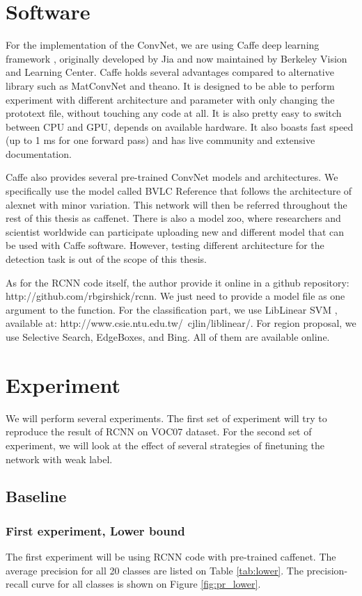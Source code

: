 \documentclass[a4paper,11pt]{kth-mag}
\begin{document}
\section{Software}
For the implementation of the ConvNet, we are using Caffe deep learning framework \cite{caffe}, originally developed by Jia and now maintained by Berkeley Vision and Learning Center. Caffe holds several advantages compared to alternative library such as MatConvNet and theano. It is designed to be able to perform experiment with different architecture and parameter with only changing the prototext file, without touching any code at all. It is also pretty easy to switch between CPU and GPU, depends on available hardware. It also boasts fast speed (up to 1 ms for one forward pass) and has live community and extensive documentation.

Caffe also provides several pre-trained ConvNet models and architectures. We specifically use the model called BVLC Reference that follows the architecture of alexnet with minor variation. This network will then be referred throughout the rest of this thesis as caffenet. There is also a model zoo, where researchers and scientist worldwide can participate uploading new and different model that can be used with Caffe software. However, testing different architecture for the detection task is out of the scope of this thesis.

As for the RCNN code itself, the author provide it online in a github repository: http://github.com/rbgirshick/rcnn. We just need to provide a model file as one argument to the function. For the classification part, we use LibLinear SVM \cite{liblinear}, available at: http://www.csie.ntu.edu.tw/~cjlin/liblinear/. For region proposal, we use Selective Search, EdgeBoxes, and Bing. All of them are available online.

\section{Experiment}
We will perform several experiments. The first set of experiment will try to reproduce the result of RCNN on VOC07 dataset. For the second set of experiment, we will look at the effect of several strategies of finetuning the network with weak label.

\subsection{Baseline}
\subsubsection{First experiment, Lower bound}
The first experiment will be using RCNN code with pre-trained caffenet. The average precision for all 20 classes are listed on Table \ref{tab:lower}. The precision-recall curve for all classes is shown on Figure \ref{fig:pr_lower}.
\end{document}

